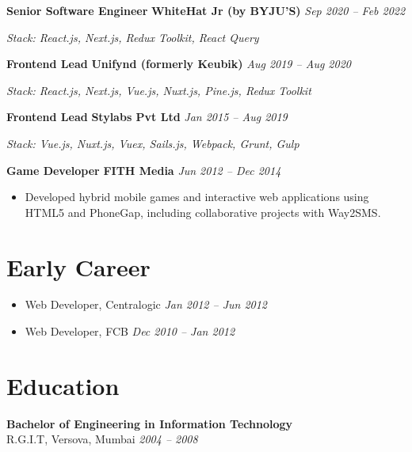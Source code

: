 \documentclass[10pt, a4paper]{article}
\begin{document}
\medskip

\textbf{Senior Software Engineer} \textbar{} \textbf{WhiteHat Jr (by BYJU'S)} \hfill \textit{Sep 2020 -- Feb 2022}
\begin{itemize}
\end{itemize}
\textit{Stack: React.js, Next.js, Redux Toolkit, React Query}

\medskip

\textbf{Frontend Lead} \textbar{} \textbf{Unifynd (formerly Keubik)} \hfill \textit{Aug 2019 -- Aug 2020}
\begin{itemize}
\end{itemize}
\textit{Stack: React.js, Next.js, Vue.js, Nuxt.js, Pine.js, Redux Toolkit}

\medskip

\textbf{Frontend Lead} \textbar{} \textbf{Stylabs Pvt Ltd} \hfill \textit{Jan 2015 -- Aug 2019}
\begin{itemize}
\end{itemize}
\textit{Stack: Vue.js, Nuxt.js, Vuex, Sails.js, Webpack, Grunt, Gulp}

\medskip

\textbf{Game Developer} \textbar{} \textbf{FITH Media} \hfill \textit{Jun 2012 -- Dec 2014}
\begin{itemize}
  \item Developed hybrid mobile games and interactive web applications using HTML5 and PhoneGap, including collaborative projects with Way2SMS.
\end{itemize}

\section{Early Career}

\begin{itemize}
  \item Web Developer, Centralogic \hfill \textit{Jan 2012 -- Jun 2012}
  \item Web Developer, FCB \hfill \textit{Dec 2010 -- Jan 2012}
\end{itemize}

\section{Education}

\textbf{Bachelor of Engineering in Information Technology}\\
R.G.I.T, Versova, Mumbai \hfill \textit{2004 -- 2008}
\end{document}
